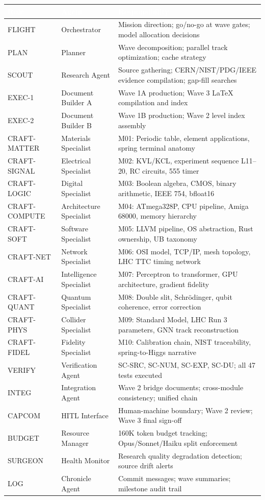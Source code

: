 \documentclass[11pt,letterpaper]{article}
\newcommand{\tableheader}[1]{\textbf{\sffamily\textcolor{white}{#1}}}
\begin{document}
\begin{center}
\begin{tabularx}{\textwidth}{L{2.2cm}L{3.2cm}X}
\toprule
{}
\tableheader{Role} & \tableheader{Agent} & \tableheader{Responsibility} \\
\midrule
FLIGHT & Orchestrator & Mission direction; go/no-go at wave gates; model allocation decisions \\
PLAN & Planner & Wave decomposition; parallel track optimization; cache strategy \\
SCOUT & Research Agent & Source gathering; CERN/NIST/PDG/IEEE evidence compilation; gap-fill searches \\
EXEC-1 & Document Builder A & Wave 1A production; Wave 3 LaTeX compilation and index \\
EXEC-2 & Document Builder B & Wave 1B production; Wave 2 level index assembly \\
CRAFT-MATTER & Materials Specialist & M01: Periodic table, element applications, spring terminal anatomy \\
CRAFT-SIGNAL & Electrical Specialist & M02: KVL/KCL, experiment sequence L11--20, RC circuits, 555 timer \\
CRAFT-LOGIC & Digital Specialist & M03: Boolean algebra, CMOS, binary arithmetic, IEEE 754, bfloat16 \\
CRAFT-COMPUTE & Architecture Specialist & M04: ATmega328P, CPU pipeline, Amiga 68000, memory hierarchy \\
CRAFT-SOFT & Software Specialist & M05: LLVM pipeline, OS abstraction, Rust ownership, UB taxonomy \\
CRAFT-NET & Network Specialist & M06: OSI model, TCP/IP, mesh topology, LHC TTC timing network \\
CRAFT-AI & Intelligence Specialist & M07: Perceptron to transformer, GPU architecture, gradient fidelity \\
CRAFT-QUANT & Quantum Specialist & M08: Double slit, Schr\"{o}dinger, qubit coherence, error correction \\
CRAFT-PHYS & Collider Specialist & M09: Standard Model, LHC Run 3 parameters, GNN track reconstruction \\
CRAFT-FIDEL & Fidelity Specialist & M10: Calibration chain, NIST traceability, spring-to-Higgs narrative \\
VERIFY & Verification Agent & SC-SRC, SC-NUM, SC-EXP, SC-DU; all 47 tests executed \\
INTEG & Integration Agent & Wave 2 bridge documents; cross-module consistency; unified chain \\
CAPCOM & HITL Interface & Human-machine boundary; Wave 2 review; Wave 3 final sign-off \\
BUDGET & Resource Manager & 160K token budget tracking; Opus/Sonnet/Haiku split enforcement \\
SURGEON & Health Monitor & Research quality degradation detection; source drift alerts \\
LOG & Chronicle Agent & Commit messages; wave summaries; milestone audit trail \\
\bottomrule
\end{tabularx}
\end{center}
\end{document}
